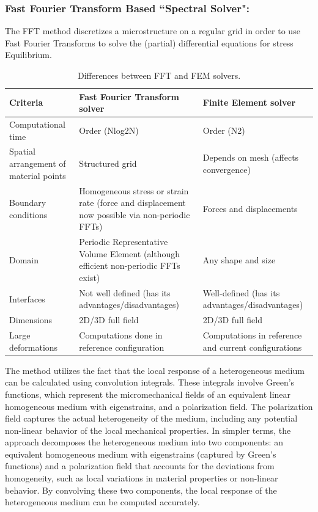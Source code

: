 \subsubsection{Fast Fourier Transform Based ``Spectral Solver":}

The FFT method discretizes a microstructure on a regular grid in order to use Fast Fourier Transforms to solve the (partial) differential equations for stress Equilibrium.

\begin{table}[H]
\centering
\caption{Differences between FFT and FEM solvers.}
\renewcommand\arraystretch{1.2}
\renewcommand\baselinestretch{1.2}
\begin{tabular}{|m{4cm}|m{5.8cm}|m{4.5cm}|}
\hline
Criteria & Fast Fourier Transform solver & Finite Element solver \\
 \hline
Computational time & Order (Nlog2N) & Order (N2)  \\
 \hline
 Spatial arrangement of material points & Structured grid & Depends on mesh (affects convergence)  \\
  \hline
 Boundary conditions & Homogeneous stress or strain rate (force and displacement now possible via non-periodic FFTs) & Forces and displacements \\
  \hline
 Domain & Periodic Representative Volume Element (although efficient non-periodic FFTs exist) & Any shape and size \\
  \hline
 Interfaces & Not well defined (has its advantages/disadvantages) & Well-defined (has its advantages/disadvantages) \\
  \hline
 Dimensions & 2D/3D full field & 2D/3D full field \\
  \hline
 Large deformations & Computations done in reference configuration & Computations in reference and current configurations \\
 \hline
\end{tabular}

\label{Differences between FFT and FEM solvers}
\end{table}

The method utilizes the fact that the local response of a heterogeneous medium can be calculated using convolution integrals. These integrals involve Green's functions, which represent the micromechanical fields of an equivalent linear homogeneous medium with eigenstrains, and a polarization field. The polarization field captures the actual heterogeneity of the medium, including any potential non-linear behavior of the local mechanical properties. In simpler terms, the approach decomposes the heterogeneous medium into two components: an equivalent homogeneous medium with eigenstrains (captured by Green's functions) and a polarization field that accounts for the deviations from homogeneity, such as local variations in material properties or non-linear behavior. By convolving these two components, the local response of the heterogeneous medium can be computed accurately.

